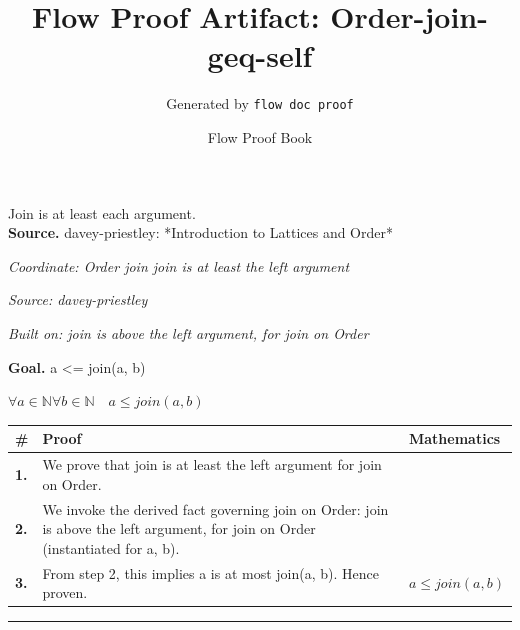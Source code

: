 \documentclass[11pt]{article}
\title{Flow Proof Artifact: Order-join-geq-self}
\author{Generated by \texttt{flow doc proof}}
\date{Flow Proof Book}
\theoremstyle{definition}
\begin{document}
\maketitle
Join is at least each argument.\\[0.5em]
\textbf{Source.} davey-priestley: *Introduction to Lattices and Order*\\[0.5em]
\bigskip
{}\par
\smallskip\noindent\textit{Coordinate: Order \cdot join \cdot join is at least the left argument}\par
\smallskip\noindent\textit{Source: davey-priestley}\par
\smallskip\noindent\textit{Built on: join is above the left argument, for join on Order}\par
\medskip
\noindent\textbf{Goal.} a <= join(a, b)\par
\noindent$\displaystyle \forall a \in \mathbb{N} \forall b \in \mathbb{N}\quad a \le join(a, b)$\par
\medskip
\noindent
\begin{tabular}{@{} >{\raggedright\arraybackslash}p{} >{\raggedright\arraybackslash}p{} >{\raggedleft\arraybackslash}p{} @{}}
\textbf{\#} & \textbf{Proof} & \textbf{Mathematics} \\
\midrule
\textbf{1.} & We prove that join is at least the left argument for join on Order. & \\[0.45em]
\textbf{2.} & We invoke the derived fact governing join on Order: join is above the left argument, for join on Order (instantiated for a, b). & \\[0.45em]
\textbf{3.} & From step 2, this implies a is at most join(a, b). Hence proven. & $\displaystyle a \le join(a, b)$ \\[0.45em]
\bottomrule
\end{tabular}
\label{thm:Order-join-join_is_at_least_the_left_argument}
\par\medskip\hrule
\end{document}
